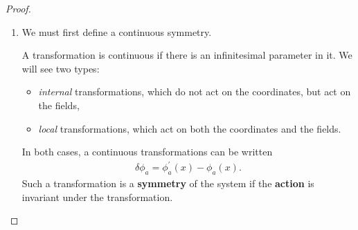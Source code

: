 \begin{proof}
    \begin{enumerate}[label=\arabic*)]
        \item We must first define a continuous symmetry.
            \begin{definition}
                A transformation is continuous if there is an infinitesimal parameter in it. We will see two types:
                \begin{itemize}
                    \item \textit{internal} transformations, which do not act on the coordinates, but act on the fields,
                    \item \textit{local} transformations, which act on both the coordinates and the fields.
                \end{itemize}
                In both cases, a continuous transformations can be written
                \begin{align}
                    \delta \phi_a = \phi_a^{'}\left( x \right) - \phi_a \left( x \right) 
                .\end{align}
                Such a transformation is a \textbf{symmetry} of the system if the \textbf{action} is invariant under the transformation.


\end{definition}
\end{enumerate}
\end{proof}
